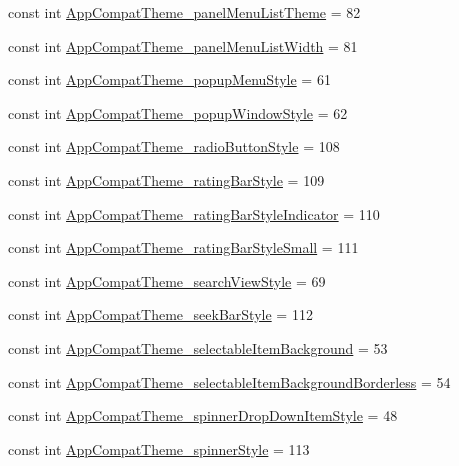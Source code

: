 \begin{CompactItemize}
const int \hyperlink{class__2doo_1_1_droid_1_1_resource_1_1_styleable_63457c9f83848e6a6baf5c495d352397}{AppCompatTheme\_\-panelMenuListTheme} = 82
\item 
const int \hyperlink{class__2doo_1_1_droid_1_1_resource_1_1_styleable_16f6187bf3f0e2fc655dedbb333f6540}{AppCompatTheme\_\-panelMenuListWidth} = 81
\item 
const int \hyperlink{class__2doo_1_1_droid_1_1_resource_1_1_styleable_5499f5457186808dedb1961311cdf9eb}{AppCompatTheme\_\-popupMenuStyle} = 61
\item 
const int \hyperlink{class__2doo_1_1_droid_1_1_resource_1_1_styleable_f85b6ac03c8a8210e21f47203247b3ab}{AppCompatTheme\_\-popupWindowStyle} = 62
\item 
const int \hyperlink{class__2doo_1_1_droid_1_1_resource_1_1_styleable_94142bc311f6690e1ede20aae1e0c1c9}{AppCompatTheme\_\-radioButtonStyle} = 108
\item 
const int \hyperlink{class__2doo_1_1_droid_1_1_resource_1_1_styleable_519868305864a4612e764b629f274210}{AppCompatTheme\_\-ratingBarStyle} = 109
\item 
const int \hyperlink{class__2doo_1_1_droid_1_1_resource_1_1_styleable_db5f0a89891f50807f6af03f642b9ed5}{AppCompatTheme\_\-ratingBarStyleIndicator} = 110
\item 
const int \hyperlink{class__2doo_1_1_droid_1_1_resource_1_1_styleable_0f2b3c2a676b7a3a94072f967a5c10ad}{AppCompatTheme\_\-ratingBarStyleSmall} = 111
\item 
const int \hyperlink{class__2doo_1_1_droid_1_1_resource_1_1_styleable_874dd76818cc3fcdd4b70d687474bef0}{AppCompatTheme\_\-searchViewStyle} = 69
\item 
const int \hyperlink{class__2doo_1_1_droid_1_1_resource_1_1_styleable_2d45fbb931b391ff47b6389d6338afaa}{AppCompatTheme\_\-seekBarStyle} = 112
\item 
const int \hyperlink{class__2doo_1_1_droid_1_1_resource_1_1_styleable_882501b21ce8df70d07c0e64cf503833}{AppCompatTheme\_\-selectableItemBackground} = 53
\item 
const int \hyperlink{class__2doo_1_1_droid_1_1_resource_1_1_styleable_2a24850b608c06f29d2737313cc05995}{AppCompatTheme\_\-selectableItemBackgroundBorderless} = 54
\item 
const int \hyperlink{class__2doo_1_1_droid_1_1_resource_1_1_styleable_203a222fdf63b76aaf96271d5ed9d45c}{AppCompatTheme\_\-spinnerDropDownItemStyle} = 48
\item 
const int \hyperlink{class__2doo_1_1_droid_1_1_resource_1_1_styleable_88fa905746d0616613539575d6a89578}{AppCompatTheme\_\-spinnerStyle} = 113

\end{CompactItemize}
